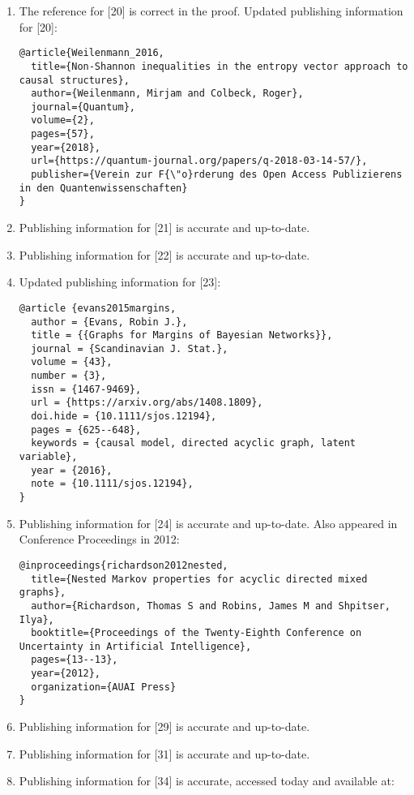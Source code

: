 \documentclass{article}
\begin{document}
\begin{enumerate}
\begin{verbatim}
}
        \end{verbatim}
        \item The reference for [20] is correct in the proof. Updated publishing information for [20]:
        \begin{verbatim}
@article{Weilenmann_2016,
  title={Non-Shannon inequalities in the entropy vector approach to causal structures},
  author={Weilenmann, Mirjam and Colbeck, Roger},
  journal={Quantum},
  volume={2},
  pages={57},
  year={2018},
  url={https://quantum-journal.org/papers/q-2018-03-14-57/},
  publisher={Verein zur F{\"o}rderung des Open Access Publizierens in den Quantenwissenschaften}
}
        \end{verbatim}
        \item Publishing information for [21] is accurate and up-to-date.
        \item Publishing information for [22] is accurate and up-to-date.
        \item Updated publishing information for [23]:
        \begin{verbatim}
@article {evans2015margins,
  author = {Evans, Robin J.},
  title = {{Graphs for Margins of Bayesian Networks}},
  journal = {Scandinavian J. Stat.},
  volume = {43},
  number = {3},
  issn = {1467-9469},
  url = {https://arxiv.org/abs/1408.1809},
  doi.hide = {10.1111/sjos.12194},
  pages = {625--648},
  keywords = {causal model, directed acyclic graph, latent variable},
  year = {2016},
  note = {10.1111/sjos.12194},
}
        \end{verbatim}
        \item Publishing information for [24] is accurate and up-to-date. Also appeared in Conference Proceedings in 2012:
        \begin{verbatim}
@inproceedings{richardson2012nested,
  title={Nested Markov properties for acyclic directed mixed graphs},
  author={Richardson, Thomas S and Robins, James M and Shpitser, Ilya},
  booktitle={Proceedings of the Twenty-Eighth Conference on Uncertainty in Artificial Intelligence},
  pages={13--13},
  year={2012},
  organization={AUAI Press}
}
        \end{verbatim}
        \item Publishing information for [29] is accurate and up-to-date.
        \item Publishing information for [31] is accurate and up-to-date.
        \item Publishing information for [34] is accurate, accessed today and available at:
        \begin{verbatim}

\end{verbatim}
\end{enumerate}
\end{document}
